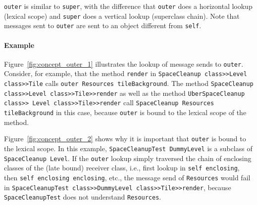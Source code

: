 \texttt{outer} is similar to \texttt{super}, with the difference that \texttt{outer} does a horizontal lookup (lexical scope) and \texttt{super} does a vertical lookup (superclass chain). Note that messages sent to \texttt{outer} are sent to an object different from \texttt{self}.

\paragraph{Example}
Figure~\ref{fig:concept_outer_1} illustrates the lookup of message sends to \texttt{outer}. Consider, for example, that the method \texttt{render} in \texttt{SpaceCleanup class>>Level class>>Tile} calls \texttt{outer Resources tileBackground}. The method \texttt{SpaceCleanup class>>Level class>>Tile>>render} as well as the method \texttt{UberSpaceCleanup class>> Level class>>Tile>>render} call \texttt{SpaceCleanup Resources tileBackground} in this case, because \texttt{outer} is bound to the lexical scope of the method.

Figure~\ref{fig:concept_outer_2} shows why it is important that \texttt{outer} is bound to the lexical scope. In this example, \texttt{SpaceCleanupTest DummyLevel} is a subclass of \texttt{SpaceCleanup Level}. If the \texttt{outer} lookup simply traversed the chain of enclosing classes of the (late bound) receiver class, i.e., first lookup in \texttt{self enclosing}, then \texttt{self enclosing enclosing}, etc., the message send of \texttt{Resources} would fail in \texttt{SpaceCleanupTest class>>DummyLevel class>>Tile>>render}, because \texttt{SpaceCleanupTest} does not understand \texttt{Resources}.

